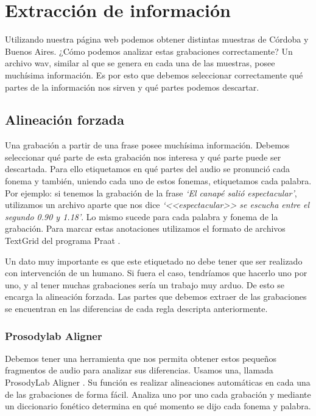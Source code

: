 \chapter{Extracción de información}
\label{extraccion}

Utilizando nuestra página web podemos obtener distintas muestras de Córdoba y Buenos Aires. ¿Cómo podemos analizar estas grabaciones correctamente? Un archivo wav, similar al que se genera en cada una de las muestras, posee muchísima información. Es por esto que debemos seleccionar correctamente qué partes de la información nos sirven y qué partes podemos descartar.

\section{Alineación forzada}

Una grabación a partir de una frase posee muchísima información. Debemos seleccionar qué parte de esta grabación nos interesa y qué parte puede ser descartada. Para ello etiquetamos en qué partes del audio se pronunció cada fonema y también, uniendo cada uno de estos fonemas, etiquetamos cada palabra. Por ejemplo: si tenemos la grabación de la frase \textit{`El canapé salió espectacular’}, utilizamos un archivo aparte que nos dice \textit{`<<espectacular>> se escucha entre el segundo 0.90 y 1.18’}. Lo mismo sucede para cada palabra y fonema de la grabación. Para marcar estas anotaciones utilizamos el formato de archivos TextGrid del programa Praat  \cite{praat}.

Un dato muy importante es que este etiquetado no debe tener que ser realizado con intervención de un humano. Si fuera el caso, tendríamos que hacerlo uno por uno, y al tener muchas grabaciones sería un trabajo muy arduo. De esto se encarga la alineación forzada. Las partes que debemos extraer de las grabaciones se encuentran en las diferencias de cada regla descripta anteriormente. 

\subsection{Prosodylab Aligner}


Debemos tener una herramienta que nos permita obtener estos pequeños fragmentos de audio para analizar sus diferencias. Usamos una, llamada ProsodyLab Aligner \cite{prosodylab}. Su función es realizar alineaciones automáticas en cada una de las grabaciones de forma fácil. Analiza uno por uno cada grabación y mediante un diccionario fonético determina en qué momento se dijo cada fonema y palabra. 


